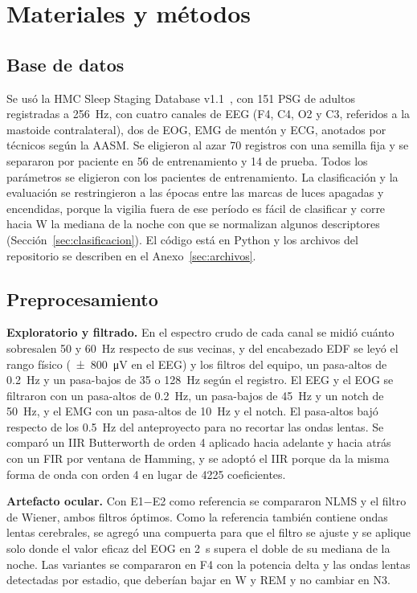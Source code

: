 \section{Materiales y métodos}

\subsection{Base de datos}
Se usó la HMC Sleep Staging Database v1.1~\cite{alvarez2022}, con 151 PSG de adultos registradas a \SI{256}{\hertz}, con cuatro canales de EEG (F4, C4, O2 y C3, referidos a la mastoide contralateral), dos de EOG, EMG de mentón y ECG, anotados por técnicos según la AASM. Se eligieron al azar 70 registros con una semilla fija y se separaron por paciente en 56 de entrenamiento y 14 de prueba. Todos los parámetros se eligieron con los pacientes de entrenamiento. La clasificación y la evaluación se restringieron a las épocas entre las marcas de luces apagadas y encendidas, porque la vigilia fuera de ese período es fácil de clasificar y corre hacia W la mediana de la noche con que se normalizan algunos descriptores (Sección~\ref{sec:clasificacion}). El código está en Python y los archivos del repositorio se describen en el Anexo~\ref{sec:archivos}.

\subsection{Preprocesamiento}
\textbf{Exploratorio y filtrado.} En el espectro crudo de cada canal se midió cuánto sobresalen 50 y \SI{60}{\hertz} respecto de sus vecinas, y del encabezado EDF se leyó el rango físico (\SI{\pm800}{\micro\volt} en el EEG) y los filtros del equipo, un pasa-altos de \SI{0,2}{\hertz} y un pasa-bajos de 35 o \SI{128}{\hertz} según el registro. El EEG y el EOG se filtraron con un pasa-altos de \SI{0,2}{\hertz}, un pasa-bajos de \SI{45}{\hertz} y un notch de \SI{50}{\hertz}, y el EMG con un pasa-altos de \SI{10}{\hertz} y el notch. El pasa-altos bajó respecto de los \SI{0,5}{\hertz} del anteproyecto para no recortar las ondas lentas. Se comparó un IIR Butterworth de orden 4 aplicado hacia adelante y hacia atrás con un FIR por ventana de Hamming, y se adoptó el IIR porque da la misma forma de onda con orden 4 en lugar de 4225 coeficientes.

\textbf{Artefacto ocular.} Con E1$-$E2 como referencia se compararon NLMS y el filtro de Wiener, ambos filtros óptimos. Como la referencia también contiene ondas lentas cerebrales, se agregó una compuerta para que el filtro se ajuste y se aplique solo donde el valor eficaz del EOG en \SI{2}{\second} supera el doble de su mediana de la noche. Las variantes se compararon en F4 con la potencia delta y las ondas lentas detectadas por estadio, que deberían bajar en W y REM y no cambiar en N3.

